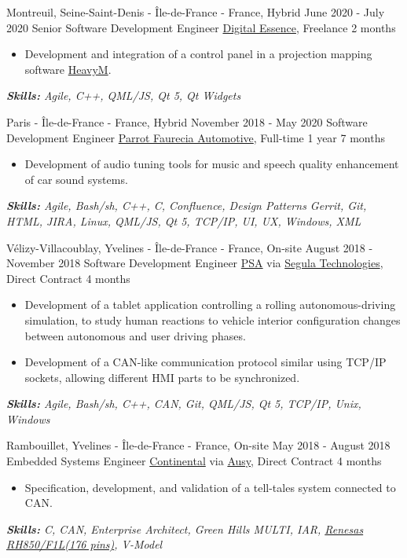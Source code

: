 \documentclass[11pt,a4paper,roman]{moderncv}
\begin{document}
\cventry
{Montreuil, Seine-Saint-Denis - Île-de-France - France, Hybrid}
{June 2020 - July 2020}
{Senior Software Development Engineer}
{\href{https://digitalessence.fr/en/}{Digital Essence}, Freelance}
{2 months}
{}
{
\begin{itemize}
\item Development and integration of a control panel in a projection mapping software \href{https://www.heavym.net}{HeavyM}.
\end{itemize}
{\textcolor{color2}{\textit{\textbf{Skills:}
	Agile,
	C++,
	QML/JS,
	Qt 5,
	Qt Widgets
	\newline
}}}}


\cventry
{Paris - Île-de-France - France, Hybrid}
{November 2018 - May 2020}
{Software Development Engineer}
{\href{https://www.faurecia-clarion.com}{Parrot Faurecia Automotive}, Full-time}
{1 year 7 months}
{}
{
\begin{itemize}
\item Development of audio tuning tools for music and speech quality enhancement of car sound systems.
\end{itemize}
{\textcolor{color2}{\textit{\textbf{Skills:}
	Agile,
	Bash/sh,
	C++,
	C,
	Confluence,
	Design Patterns
	Gerrit,
	Git,
	HTML,
	JIRA,
	Linux,
	QML/JS,
	Qt 5,
	TCP/IP,
	UI,
	UX,
	Windows,
	XML
	\newline
}}}}

\cventry
{Vélizy-Villacoublay, Yvelines - Île-de-France - France, On-site}
{August 2018 - November 2018}
{Software Development Engineer}
{\href{https://www.groupe-psa.com/en/}{PSA} via \href{https://www.segulatechnologies.com/en/}{Segula Technologies}, Direct Contract}
{4 months}
{}
{
\begin{itemize}
	\item Development of a tablet application controlling a rolling autonomous-driving simulation, to study human reactions to vehicle interior configuration changes between autonomous and user driving phases.
	\item Development of a CAN-like communication protocol similar using TCP/IP sockets, allowing different HMI parts to be synchronized.
\end{itemize}
{\textcolor{color2}{\textit{\textbf{Skills:}
	Agile,
	Bash/sh,
	C++,
	CAN,
	Git,
	QML/JS,
	Qt 5,
	TCP/IP,
	Unix,
	Windows
	\newline
}}}}


\cventry
{Rambouillet, Yvelines - Île-de-France - France, On-site}
{May 2018 - August 2018}
{Embedded Systems Engineer}
{\href{https://www.continental.com/en}{Continental} via \href{https://www.ausy.com/en}{Ausy}, Direct Contract}
{4 months}
{}
{
\begin{itemize}
	\item Specification, development, and validation of a tell-tales system connected to CAN.
\end{itemize}
{\textcolor{color2}{\textit{\textbf{Skills:}
	C,
	CAN,
	Enterprise Architect,
	Green Hills MULTI,
	IAR,
	\href{https://www.renesas.com/eu/en/products/microcontrollers-microprocessors/rh850/rh850f1x/rh850f1l.html}{Renesas RH850/F1L(176 pins)},
	V-Model
	\newline
}}}}
\end{document}
